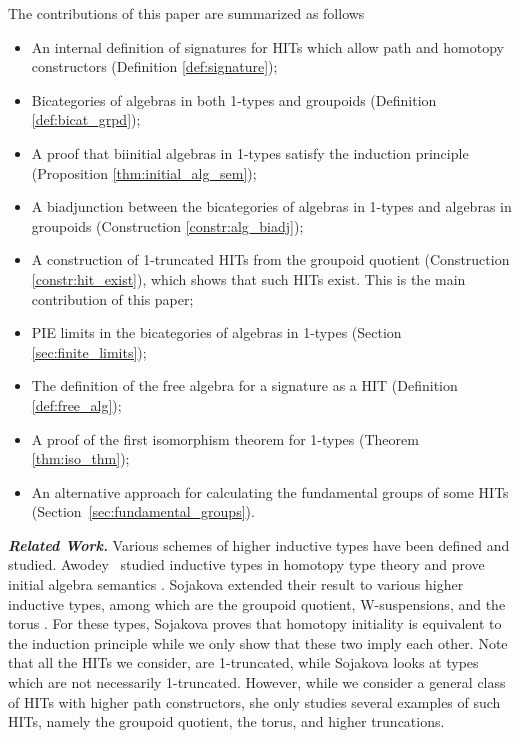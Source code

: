 The contributions of this paper are summarized as follows
\begin{itemize}
	\item An internal definition of signatures for HITs which allow path and homotopy constructors (Definition \ref{def:signature});
	\item Bicategories of algebras in both 1-types and groupoids (Definition \ref{def:bicat_grpd});
	\item A proof that biinitial algebras in 1-types satisfy the induction principle (Proposition \ref{thm:initial_alg_sem});
	\item A biadjunction between the bicategories of algebras in 1-types and algebras in groupoids (Construction \ref{constr:alg_biadj});
	\item A construction of 1-truncated HITs from the groupoid quotient (Construction \ref{constr:hit_exist}),
	which shows that such HITs exist.
	This is the main contribution of this paper;
        \item PIE limits in the bicategories of algebras in 1-types (Section \ref{sec:finite_limits});
        \item The definition of the free algebra for a signature as a HIT (Definition \ref{def:free_alg});
        \item A proof of the first isomorphism theorem for 1-types (Theorem \ref{thm:iso_thm});
        \item An alternative approach for calculating the fundamental groups of some HITs (Section~\ref{sec:fundamental_groups}).
\end{itemize}
\emph{\textbf{Related Work.}}
Various schemes of higher inductive types have been defined and studied.
Awodey \etal \ studied inductive types in homotopy type theory and prove initial
algebra semantics \cite{AwodeyGS12}.
Sojakova extended their result to various higher inductive types, among which
are the groupoid quotient, W-suspensions, and the torus \cite{Sojakova15,sojakovaPhD}.
For these types, Sojakova proves that homotopy initiality is equivalent to the induction principle while we only show that these two imply each other.
Note that all the HITs we consider, are 1-truncated, while Sojakova looks at types which are not necessarily 1-truncated.
However, while we consider a general class of HITs with higher path constructors, she only studies several examples of such HITs, namely the groupoid quotient, the torus, and higher truncations.
